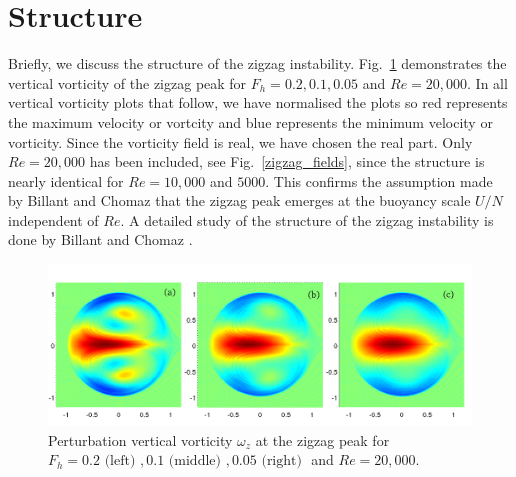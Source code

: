 \section{Structure} 
Briefly, we discuss the structure of the zigzag instability. Fig.~\ref{zigzag_vorticity} demonstrates the vertical vorticity of the zigzag peak for $F_{h}=0.2,0.1,0.05$ and $Re=20{,}000$. In all vertical vorticity plots that follow, we have normalised the plots so red represents the maximum velocity or vortcity and blue represents the minimum velocity  or vorticity. Since the vorticity field is real, we have chosen the real part. Only $Re=20{,}000$ has been included, see Fig.~\ref{zigzag_fields}, since the structure is nearly identical for $Re=10{,}000$ and $5000$. This confirms the assumption made by Billant and Chomaz \cite{bc2000b} that the zigzag peak emerges at the buoyancy scale $U/N$ independent of $Re$. A detailed study of the structure of the zigzag instability is done by Billant and Chomaz \cite{bc2000c}. 
\begin{figure} 
\begin{center}
\includegraphics[width=\textwidth]{vorticity_zigzag}
\caption{Perturbation vertical vorticity $\omega_{z}$ at the zigzag peak for $F_{h}=0.2 \text{ (left) }, 0.1 \text{ (middle) }, 0.05 \text{ (right) }$ and $Re=20{,}000$.}
\label{zigzag_vorticity}
\end{center}
\end{figure} 

